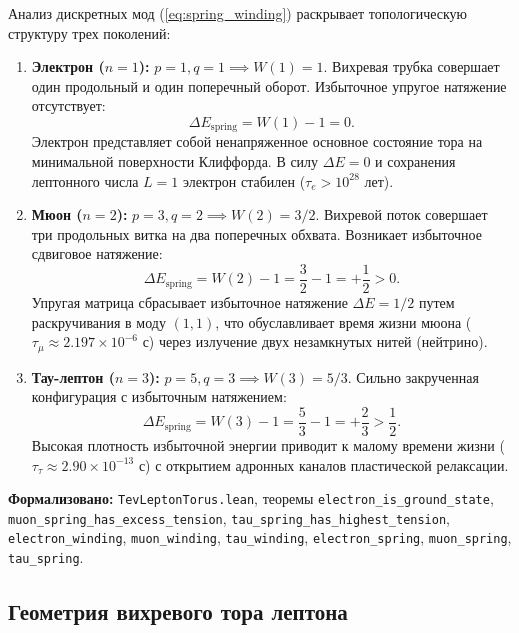 \documentclass[11pt,a4paper]{article}
\theoremstyle{definition}
\theoremstyle{remark}
\begin{document}
Анализ дискретных мод (\ref{eq:spring_winding}) раскрывает топологическую структуру трех поколений:
\begin{enumerate}
\item \textbf{Электрон ($n = 1$):} $p=1, q=1 \implies W(1) = 1$. Вихревая трубка совершает один продольный и один поперечный оборот. Избыточное упругое натяжение отсутствует:
\begin{equation}
	\Delta E_{\mathrm{spring}} = W(1) - 1 = 0.
	\label{eq:electron_tension_zero}
\end{equation}
Электрон представляет собой ненапряженное основное состояние тора на минимальной поверхности Клиффорда. В силу $\Delta E = 0$ и сохранения лептонного числа $L=1$ электрон стабилен ($\tau_e > 10^{28}\text{ лет}$).

\item \textbf{Мюон ($n = 2$):} $p=3, q=2 \implies W(2) = 3/2$. Вихревой поток совершает три продольных витка на два поперечных обхвата. Возникает избыточное сдвиговое натяжение:
\begin{equation}
	\Delta E_{\mathrm{spring}} = W(2) - 1 = \frac{3}{2} - 1 = +\frac{1}{2} > 0.
	\label{eq:muon_excess_tension}
\end{equation}
Упругая матрица сбрасывает избыточное натяжение $\Delta E = 1/2$ путем раскручивания в моду $(1,1)$, что обуславливает время жизни мюона ($\tau_\mu \approx 2.197 \times 10^{-6}\text{ с}$) через излучение двух незамкнутых нитей (нейтрино).

\item \textbf{Тау-лептон ($n = 3$):} $p=5, q=3 \implies W(3) = 5/3$. Сильно закрученная конфигурация с избыточным натяжением:
\begin{equation}
	\Delta E_{\mathrm{spring}} = W(3) - 1 = \frac{5}{3} - 1 = +\frac{2}{3} > \frac{1}{2}.
	\label{eq:tau_excess_tension}
\end{equation}
Высокая плотность избыточной энергии приводит к малому времени жизни ($\tau_\tau \approx 2.90 \times 10^{-13}\text{ с}$) с открытием адронных каналов пластической релаксации.
\end{enumerate}

\noindent\small\textbf{Формализовано:} \texttt{TevLeptonTorus.lean}, теоремы \texttt{electron_is_ground_state}, \texttt{muon_spring_has_excess_tension}, \texttt{tau_spring_has_highest_tension}, \texttt{electron\_winding}, \texttt{muon\_winding}, \texttt{tau\_winding},
\texttt{electron_spring}, \texttt{muon_spring}, \texttt{tau_spring}.

\subsection{Геометрия вихревого тора лептона}
	
\end{document}
